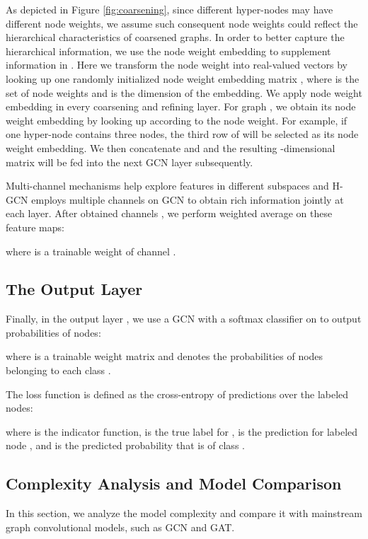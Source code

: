 \documentclass{article}
\begin{document}
As depicted in Figure \ref{fig:coarsening}, since different hyper-nodes may have different node weights, we assume such consequent node weights could reflect the hierarchical characteristics of coarsened graphs. In order to better capture the hierarchical information, we use the node weight embedding to supplement information in . Here we transform the node weight into real-valued vectors by looking up one randomly initialized node weight embedding matrix , where  is the set of node weights and  is the dimension of the embedding. We apply node weight embedding in every coarsening and refining layer. For graph , we obtain its node weight embedding  by looking up  according to the node weight. For example, if one hyper-node contains three nodes, the third row of  will be selected as its node weight embedding. We then concatenate  and  and the resulting -dimensional matrix will be fed into the next GCN layer subsequently.

Multi-channel mechanisms help explore features in different subspaces and H-GCN employs multiple channels on GCN to obtain rich information jointly at each layer. After obtained  channels , we perform weighted average on these feature maps:

where  is a trainable weight of channel .

\subsection{The Output Layer}

Finally, in the output layer , we use a GCN with a softmax classifier on  to output probabilities of nodes:

where  is a trainable weight matrix and  denotes the probabilities of nodes belonging to each class .

The loss function is defined as the cross-entropy of predictions over the labeled nodes:

where  is the indicator function,  is the true label for ,  is the prediction for labeled node , and  is the predicted probability that  is of class .

\subsection{Complexity Analysis and Model Comparison}

In this section, we analyze the model complexity and compare it with mainstream graph convolutional models, such as GCN and GAT.
\end{document}
